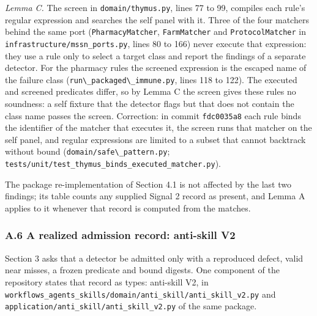 \documentclass[
  11pt,
]{article}
\newcommand{\passthrough}[1]{#1}
\begin{document}
\emph{Lemma C.} The screen in
\passthrough{\lstinline!domain/thymus.py!}, lines 77 to 99, compiles
each rule's regular expression and searches the self panel with it.
Three of the four matchers behind the same port
(\passthrough{\lstinline!PharmacyMatcher!},
\passthrough{\lstinline!FarmMatcher!} and
\passthrough{\lstinline!ProtocolMatcher!} in
\nolinkurl{infrastructure/mssn_ports.py}, lines 80 to 166) never execute
that expression: they use a rule only to select a target class and
report the findings of a separate detector. For the pharmacy rules the
screened expression is the escaped name of the failure class
(\passthrough{\lstinline!run\_packaged\_immune.py!}, lines 118 to 122).
The executed and screened predicates differ, so by Lemma C the screen
gives these rules no soundness: a self fixture that the detector flags
but that does not contain the class name passes the screen. Correction:
in commit \passthrough{\lstinline!fdc0035a8!} each rule binds the
identifier of the matcher that executes it, the screen runs that matcher
on the self panel, and regular expressions are limited to a subset that
cannot backtrack without bound
(\passthrough{\lstinline!domain/safe\_pattern.py!};
\nolinkurl{tests/unit/test_thymus_binds_executed_matcher.py}).

The package re-implementation of Section 4.1 is not affected by the last
two findings; its table counts any supplied Signal 2 record as present,
and Lemma A applies to it whenever that record is computed from the
matches.

\subsubsection{A.6 A realized admission record: anti-skill
V2}\label{a.6-a-realized-admission-record-anti-skill-v2}

Section 3 asks that a detector be admitted only with a reproduced
defect, valid near misses, a frozen predicate and bound digests. One
component of the repository states that record as types: anti-skill V2,
in
\nolinkurl{workflows_agents_skills/domain/anti_skill/anti_skill_v2.py}
and \nolinkurl{application/anti_skill/anti_skill_v2.py} of the same
package.
\end{document}
